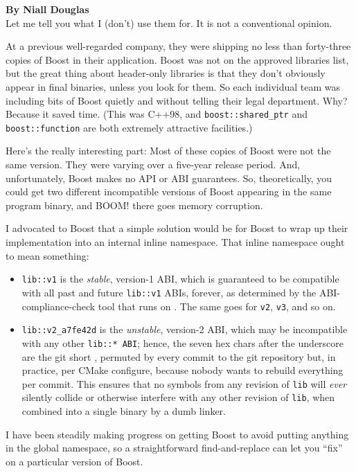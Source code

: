 \noindent\textbf{By Niall Douglas}\\[.5ex]

\noindent Let me tell you what I (don't) use them for. It is not a conventional
opinion.

At a previous well-regarded company, they were shipping no less than
forty-three copies of Boost in their application. Boost was not on the
approved libraries list, but the great thing about header-only libraries
is that they don't obviously appear in final binaries, unless you look
for them. So each individual team was including bits of Boost quietly
and without telling their legal department. Why? Because it saved time.
(This was C++98, and \lstinline!boost::shared_ptr! and
\lstinline!boost::function! are both extremely attractive facilities.)

Here's the really interesting part: Most of these copies of Boost were
not the same version. They were varying over a five-year release period.
And, unfortunately, Boost makes no API or ABI guarantees. So,
theoretically, you could get two different incompatible versions of
Boost appearing in the same program binary, and BOOM! there goes memory
corruption.

I advocated to Boost that a simple solution would be for Boost to wrap
up their implementation into an internal inline namespace. That inline
namespace ought to mean something:
\begin{itemize}
\item{\lstinline!lib::v1! is the \emph{stable}, version-1 ABI, which is guaranteed to be compatible with all past and future \lstinline!lib::v1! ABIs, forever, as determined by the ABI-compliance-check tool that runs on . The same goes for \lstinline!v2!, \lstinline!v3!, and so on.}
\item{\lstinline!lib::v2_a7fe42d! is the \emph{unstable}, version-2 ABI, which may be incompatible with any other \lstinline!lib::*!~\lstinline!ABI!; hence, the seven hex chars after the underscore are the git short , permuted by every commit to the git repository but, in practice, per CMake configure, because nobody wants to rebuild everything per commit. This ensures that no symbols from any revision of \lstinline!lib! will \emph{ever} silently collide or otherwise interfere with any other revision of \lstinline!lib!, when combined into a single binary by a dumb linker.}
\end{itemize}

I have been steadily making progress on getting Boost to avoid putting
anything in the global namespace, so a straightforward find-and-replace
can let you ``fix'' on a particular version of Boost.

